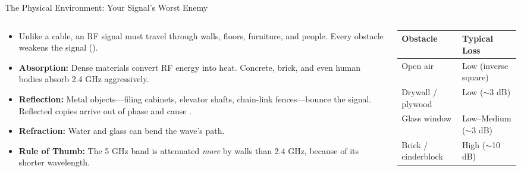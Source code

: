 \documentclass[aspectratio=169]{beamer}
\begin{document}

\begin{frame}{The Physical Environment: Your Signal's Worst Enemy}
    \begin{columns}[T]
        \begin{column}{0.52\textwidth}
            \footnotesize
            \begin{itemize}
                \item Unlike a cable, an RF signal must travel through walls, floors, furniture, and people. Every obstacle weakens the signal ().
                \item \textbf{Absorption:} Dense materials convert RF energy into heat. Concrete, brick, and even human bodies absorb 2.4 GHz aggressively.
                \item \textbf{Reflection:} Metal objects---filing cabinets, elevator shafts, chain-link fences---bounce the signal. Reflected copies arrive out of phase and cause .
                \item \textbf{Refraction:} Water and glass can bend the wave's path.
                \item \textbf{Rule of Thumb:} The 5 GHz band is attenuated \emph{more} by walls than 2.4 GHz, because of its shorter wavelength.
            \end{itemize}
        \end{column}
        \begin{column}{0.44\textwidth}
            \begin{table}[]
                \renewcommand{\arraystretch}{1.3}
                \centering
                \scriptsize
                \begin{tabular}{|l|l|}
                \hline
                \rowcolor[HTML]{EFEFEF} \textbf{Obstacle} & \textbf{Typical Loss} \\ \hline
                Open air & Low (inverse square) \\ \hline
                Drywall / plywood & Low ($\sim$3 dB) \\ \hline
                Glass window & Low--Medium ($\sim$3 dB) \\ \hline
                Brick / cinderblock & High ($\sim$10 dB) \\ \hline

\end{tabular}
\end{table}
\end{column}
\end{columns}
\end{frame}
\end{document}
